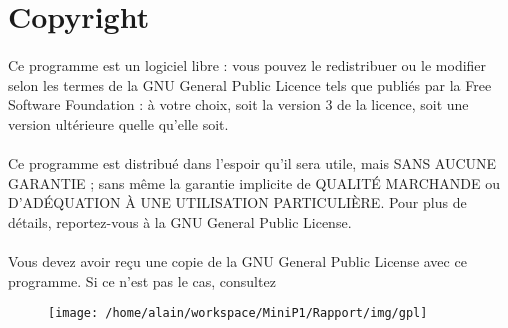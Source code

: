 \section{Copyright}
	\paragraph{}
    Ce programme est un logiciel libre : vous pouvez le redistribuer ou
    le modifier selon les termes de la GNU General Public Licence tels
    que publiés par la Free Software Foundation : à votre choix, soit la
    version 3 de la licence, soit une version ultérieure quelle qu'elle
    soit.
	\paragraph{}
    Ce programme est distribué dans l'espoir qu'il sera utile, mais SANS
    AUCUNE GARANTIE ; sans même la garantie implicite de QUALITÉ
    MARCHANDE ou D'ADÉQUATION À UNE UTILISATION PARTICULIÈRE. Pour
    plus de détails, reportez-vous à la GNU General Public License.
	\paragraph	{}
    Vous devez avoir reçu une copie de la GNU General Public License
    avec ce programme. Si ce n'est pas le cas, consultez
 \cite{GNU}   
  \begin{figure}[htbp]
    \centering
    \texttt{[image: /home/alain/workspace/MiniP1/Rapport/img/gpl]}
  \end{figure}  
